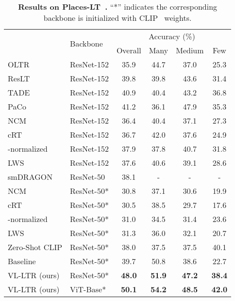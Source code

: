 \documentclass[runningheads]{llncs}
\newlength\savedwidth
\newcommand\whline{\noalign{\global\savedwidth\arrayrulewidth\global\arrayrulewidth 0.8pt}\hline\noalign{\global\arrayrulewidth\savedwidth}}
\begin{document}
\begin{table}[t]
    \centering
\setlength{\tabcolsep}{3mm}
    \begin{tabular}{l|l|c|c|c|c}
\renewcommand{\arraystretch}{0.1}
\multirow{2}{*}{Method} & \multirow{2}{*}{Backbone}  & \multicolumn{4}{c}{Accuracy (\%)} \\
	\cline{3-6} 
	&  & Overall & Many & Medium & Few  \\
	\whline
	OLTR \cite{liu2019large} & ResNet-152 & 35.9 & 44.7 & 37.0 & 25.3 \\
	ResLT~\cite{cui2021reslt} & ResNet-152 & 39.8 & 39.8 & 43.6 & 31.4 \\
	TADE~\cite{zhang2021test} & ResNet-152 & 40.9 & 40.4 & 43.2 & 36.8 \\
	PaCo~\cite{cui2021parametric} & ResNet-152 & 41.2 & 36.1 & 47.9 & 35.3 \\
	
	NCM \cite{kang2019decoupling} & ResNet-152 & 36.4 & 40.4 & 37.1 & 27.3 \\
	cRT \cite{kang2019decoupling} & ResNet-152 & 36.7 & 42.0 & 37.6 & 24.9 \\
	-normalized \cite{kang2019decoupling} & ResNet-152 & 37.9 & 37.8 & 40.7 & 31.8 \\
	LWS \cite{kang2019decoupling} & ResNet-152 & 37.6 & 40.6 & 39.1 & 28.6 \\
	smDRAGON~\cite{samuel2021generalized} & ResNet-50 & 38.1 & - & - & - \\
	\hline
	NCM \cite{kang2019decoupling} & ResNet-50* & 30.8 & 37.1 & 30.6 & 19.9 \\
	cRT \cite{kang2019decoupling} & ResNet-50* & 30.5 & 38.5 & 29.7 & 17.6 \\
	-normalized \cite{kang2019decoupling} & ResNet-50* & 31.0 & 34.5 & 31.4 & 23.6 \\
	LWS \cite{kang2019decoupling} & ResNet-50* & 31.3 & 36.0 & 32.1 & 20.7 \\
	Zero-Shot CLIP \cite{clip} & ResNet-50* &   38.0  &  37.5 &  37.5  &  40.1 \\
	Baseline & ResNet-50* & 39.7 & 50.8 & 38.6 & 22.7 \\
	\rowcolor{mygray}
	VL-LTR (ours) & ResNet-50* & \bf{48.0} & \bf{51.9} & \bf{47.2} & \bf{38.4} \\
	\rowcolor{mygray}
	VL-LTR (ours) & ViT-Base* & \textbf{50.1} & \textbf{54.2} & \textbf{48.5} & \textbf{42.0}  \\
	
\end{tabular} \caption{\textbf{Results on Places-LT~\cite{liu2019large}.}
``*'' indicates the corresponding backbone is initialized with CLIP~\cite{clip} weights.}
    \label{tab:places_lt}
\end{table}
\end{document}
